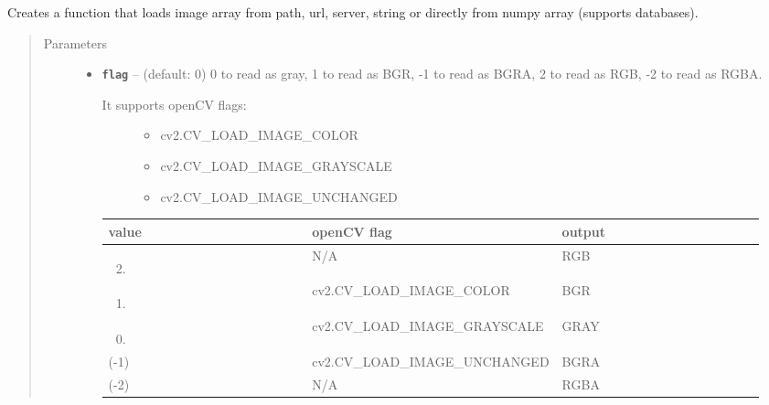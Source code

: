 \documentclass[letterpaper,10pt,english]{sphinxmanual}
\begin{document}
\begin{fulllineitems}
\label{RRtoolbox.lib:RRtoolbox.lib.image.loadFunc}
Creates a function that loads image array from path, url,
server, string or directly from numpy array (supports databases).
\begin{quote}\begin{description}
\item[{Parameters}] \leavevmode\begin{itemize}
\item {} 
\textbf{\texttt{flag}} -- 
(default: 0) 0 to read as gray, 1 to read as BGR, -1 to
read as BGRA, 2 to read as RGB, -2 to read as RGBA.
\begin{description}
\item[{It supports openCV flags:}] \leavevmode\begin{itemize}
\item {} 
cv2.CV\_LOAD\_IMAGE\_COLOR

\item {} 
cv2.CV\_LOAD\_IMAGE\_GRAYSCALE

\item {} 
cv2.CV\_LOAD\_IMAGE\_UNCHANGED

\end{itemize}

\end{description}

\begin{tabular}{|p{0.317\linewidth}|p{0.317\linewidth}|p{0.317\linewidth}|}
\hline
\textsf{\relax 
value
} & \textsf{\relax 
openCV flag
} & \textsf{\relax 
output
}\\
\hline\begin{enumerate}
\setcounter{enumi}{1}
\item {} 
\end{enumerate}
 & 
N/A
 & 
RGB
\\
\hline\begin{enumerate}
\item {} 
\end{enumerate}
 & 
cv2.CV\_LOAD\_IMAGE\_COLOR
 & 
BGR
\\
\hline\begin{enumerate}
\setcounter{enumi}{-1}
\item {} 
\end{enumerate}
 & 
cv2.CV\_LOAD\_IMAGE\_GRAYSCALE
 & 
GRAY
\\
\hline
(-1)
 & 
cv2.CV\_LOAD\_IMAGE\_UNCHANGED
 & 
BGRA
\\
\hline
(-2)
 & 
N/A
 & 
RGBA
\\
\hline\end{tabular}




\end{itemize}
\end{description}
\end{quote}
\end{fulllineitems}
\end{document}
